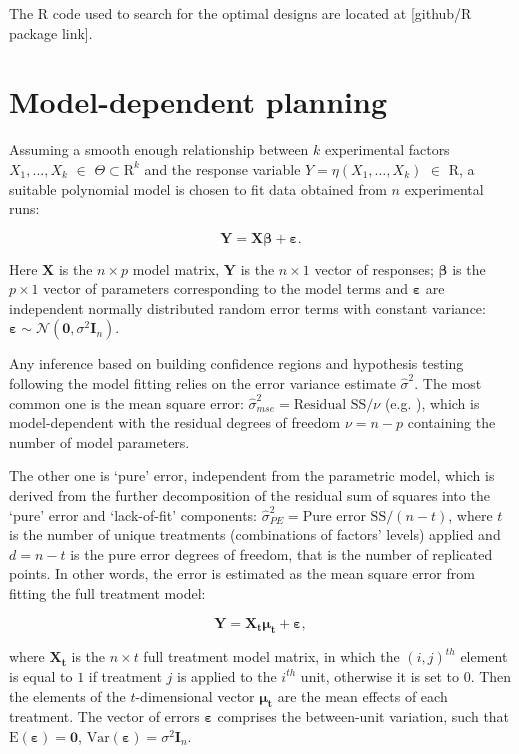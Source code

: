 \documentclass[11pt]{article}
\begin{document}
The $\mbox{R}$ code used to search for the optimal designs are located at [github/R package link].

\section{Model-dependent planning}
\label{sec::background}

Assuming a smooth enough relationship between $k$ experimental factors $X_1, \dots, X_k$ $\in$ $\Theta \subset \mbox{R}^{k}$ and the response variable $Y=\eta(X_1,\ldots, X_k)$ $\in$ $\mbox{R}$, a suitable polynomial model is chosen to fit data obtained from $n$ experimental runs:

\begin{equation}
\label{eq::primary_model}
\bm{Y}=\bm{X\beta}+\bm{\varepsilon}.
\end{equation} 

Here $\bm{X}$ is the $n\times p$ model matrix, $\bm{Y}$ is the $n\times 1$ vector of responses; $\bm{\beta}$ is the $p\times 1$ vector of parameters corresponding to the model terms and $\bm{\varepsilon}$ are independent normally distributed random error terms with constant variance: $\bm{\varepsilon}\sim \mathcal{N}(\bm{0},\sigma^{2}\bm{I}_{n})$. 

Any inference based on building confidence regions and hypothesis testing following the model fitting relies on the error variance estimate $\hat{\sigma}^2$. The most common one is the mean square error: $\hat{\sigma}^2_{mse}=\mbox{Residual SS}/\nu$ (e.g. \cite{Draper1998}), which is model-dependent with the residual degrees of freedom $\nu = n-p$ containing the number of model parameters. 

The other one is `pure' error, independent from the parametric model, which is derived from the further decomposition of the residual sum of squares into the `pure' error and `lack-of-fit' components: $\hat{\sigma}^2_{PE}=\mbox{Pure error SS}/(n-t)$, where $t$ is the number of unique treatments (combinations of factors' levels) applied and $d=n-t$ is the pure error degrees of freedom, that is the number of replicated points. In other words, the error is estimated as the mean square error from fitting the full treatment model:

\begin{equation}
\label{eq::treatment_model}
\bm{Y}=\bm{X_{t}\mu_{t}}+\bm{\varepsilon},
\end{equation} 

where $\bm{X_{t}}$ is the $n\times t$ full treatment model matrix, in which the $(i,j)^{th}$ element is equal to $1$ if treatment $j$ is applied to the $i^{th}$ unit, otherwise it is set to $0$. Then the elements of the $t$-dimensional vector $\bm{\mu_{t}}$ are the mean effects of each treatment. The vector of errors $\bm{\varepsilon}$ comprises the between-unit variation, such that $\mbox{E}(\bm{\varepsilon})=\bm{0}$, $\mbox{Var}(\bm{\varepsilon})=\sigma^2\bm{I}_{n}$.
\end{document}
